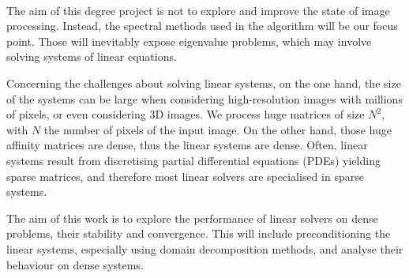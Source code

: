 \paragraph{}
The aim of this degree project is not to explore and improve the state of image processing.
Instead, the spectral methods used in the algorithm will be our focus point.
Those will inevitably expose eigenvalue problems, which may involve solving systems of linear equations.

Concerning the challenges about solving linear systems, on the one hand, the size of the systems can be large when considering high-resolution images with millions of pixels, or even considering 3D images.
We process huge matrices of size \(N^2\), with \(N\) the number of pixels of the input image.
On the other hand, those huge affinity matrices are dense, thus the linear systems are dense.
Often, linear systems result from discretising partial differential equations (PDEs) yielding sparse matrices, and therefore most linear solvers are specialised in sparse systems.

The aim of this work is to explore the performance of linear solvers on dense problems, their stability and convergence.
This will include preconditioning the linear systems, especially using domain decomposition methods, and analyse their behaviour on dense systems.

